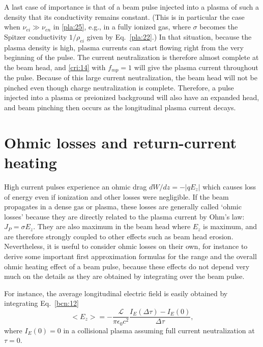 \documentclass [12pt,a4paper,     ]{report} %
\begin{document}
	A last case of importance is that of a beam pulse injected into a plasma of such a density that its conductivity remains constant.  (This is in particular the case when $\nu_{ei} \gg \nu_{en}$ in \eqref{pla:25}, e.g., in a fully ionized gas, where $\sigma$ becomes the Spitzer conductivity $1/\rho_{ei}$ given by Eq.~\eqref{pla:22}.) In that situation, because the plasma density is high, plasma currents can start flowing right from the very beginning of the pulse.  The current neutralization is therefore almost complete at the beam head, and \eqref{cri:14} with $f_{mp} = 1$ will give the plasma current throughout the pulse.  Because of this large current neutralization, the beam head will not be pinched even though charge neutralization is complete.  Therefore, a pulse injected into a plasma or preionized background will also have an expanded head, and beam pinching then occurs as the longitudinal plasma current decays.



\section{Ohmic losses and return-current heating}
\label{ohm:0}

    High current pulses experience an ohmic drag $dW/dz=-|qE_z|$ which causes loss of energy even if ionization and other losses were negligible.  If the beam propagates in a dense gas or plasma, these losses are generally called `ohmic losses' because they are directly related to the plasma current by Ohm's law: $J_P = \sigma E_z$.  They are also maximum in the beam head where  $E_z$ is maximum, and are therefore strongly coupled to other effects such as beam head erosion.   Nevertheless, it is useful to consider ohmic losses on their own, for instance to derive some important first approximation formulas for the range and the overall ohmic heating effect of a beam pulse, because these effects do not depend very much on the details as they are obtained by integrating over the beam pulse. 

   For instance, the average longitudinal electric field is easily obtained by integrating Eq.~\eqref{bcn:12}
%
\begin{equation}\label{ohm:1} %
    <E_z> =   -\frac{\mathcal{L}}{\pi\epsilon_0 c^2}
               \frac{I_E(\Delta\tau) - I_E(0)}{\Delta\tau},
\end{equation}
%
where $I_E(0) = 0$ in a collisional plasma assuming full current neutralization at $\tau=0$.
\end{document}
